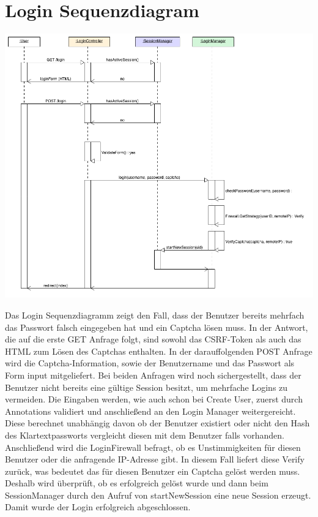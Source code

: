\documentclass[12pt,DIV14,BCOR10mm,a4paper,parskip=half-,headsepline,headinclude,english,ngerman,bibliography=totocnumbered]{scrreprt}
\begin{document}
\section{Login Sequenzdiagram}
\includegraphics[width=0.70\paperwidth]{resources/loginseq_diagram.png}

Das Login Sequenzdiagramm zeigt den Fall, dass der Benutzer bereits mehrfach das Passwort falsch eingegeben hat und ein Captcha lösen muss. In der Antwort, die auf die erste GET Anfrage folgt, sind sowohl das CSRF-Token als auch das HTML zum Lösen des Captchas enthalten. In der darauffolgenden POST Anfrage wird die Captcha-Information, sowie der Benutzername und das Passwort als Form input mitgeliefert. Bei beiden Anfragen wird noch sichergestellt, dass der Benutzer nicht bereits eine gültige Session besitzt, um mehrfache Logins zu vermeiden. Die Eingaben werden, wie auch schon bei Create User, zuerst durch Annotations validiert und anschließend an den Login Manager weitergereicht. Diese berechnet unabhängig davon ob der Benutzer existiert oder nicht den Hash des Klartextpassworts vergleicht diesen mit dem Benutzer falls vorhanden. Anschließend wird die LoginFirewall befragt, ob es Unstimmigkeiten für diesen Benutzer oder die anfragende IP-Adresse gibt. In diesem Fall liefert diese Verify zurück, was bedeutet das für diesen Benutzer ein Captcha gelöst werden muss. Deshalb wird überprüft, ob es erfolgreich gelöst wurde und dann beim SessionManager durch den Aufruf von startNewSession eine neue Session erzeugt. Damit wurde der Login erfolgreich abgeschlossen.
\end{document}
